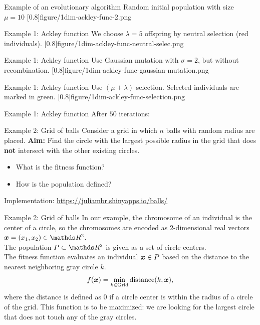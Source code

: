 \documentclass[11pt,compress,t,notes=noshow, xcolor=table]{beamer}
\begin{document}
\begin{framev}[align=top]{Example of an evolutionary algorithm}
Random initial population with size $\mu = 10$
\imageFixed{2.5cm}{2.5cm}[0.8]{figure/1dim-ackley-func-2.png}
\end{framev}


\begin{framev}[align=top]{Example 1: Ackley function}
We choose $\lambda = 5$ offspring by neutral selection (red individuals).
\imageFixed{2.5cm}{2.5cm}[0.8]{figure/1dim-ackley-func-neutral-selec.png}
\end{framev}


\begin{framev}[align=top]{Example 1: Ackley function}
Use Gaussian mutation with $\sigma=2$, but without recombination.
\imageFixed{2.5cm}{2.5cm}[0.8]{figure/1dim-ackley-func-gaussian-mutation.png}
\end{framev}


\begin{framev}[align=top]{Example 1: Ackley function}
Use $(\mu + \lambda)$ selection.
Selected individuals are marked in green.
\imageFixed{2.5cm}{2.5cm}[0.8]{figure/1dim-ackley-func-selection.png}
\end{framev}


\begin{framev}{Example 1: Ackley function}
After $50$ iterations: 
\vfill
{}
\end{framev}


\begin{framev}{Example 2: Grid of balls}
Consider a grid in which $n$ balls with random radius are placed.
\textbf{Aim:} Find the circle with the largest possible radius in the grid that does \textbf{not} intersect with the other existing circles.
\begin{itemize}
\item What is the fitness function?
\item How is the population defined?
\end{itemize}
Implementation: \url{https://juliambr.shinyapps.io/balls/}
\end{framev}


\begin{framev}{Example 2: Grid of balls}
In our example, the chromosome of an individual is the center of a circle, so the chromosomes are encoded as 2-dimensional real vectors $\xv = (x_1, x_2) \in \R^2$.\\
\spacer
The population $P \subset \R^2$ is given as a set of circle centers.\\
\spacer
The fitness function evaluates an individual $\bm{x} \in P$ based on the distance to the nearest neighboring gray circle $k$.
$$
f(\bm{x}) = \min_{k \in \text{Grid}} \text{distance} (k, \bm{x}),
$$
where the distance is defined as $0$ if a circle center is within the radius of a circle of the grid.
This function is to be maximized: we are looking for the largest circle that does not touch any of the gray circles.
\end{framev}

\endlecture
\end{document}
